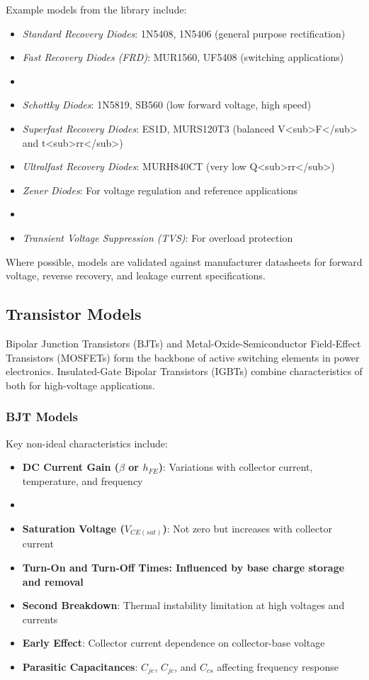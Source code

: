 Example models from the library include:
\begin{itemize}
    \item \textit{Standard Recovery Diodes}: 1N5408, 1N5406 (general purpose rectification)
    \item \textit{Fast Recovery Diodes (FRD)}: MUR1560, UF5408 (switching applications)
    \item \item \textit{Schottky Diodes}: 1N5819, SB560 (low forward voltage, high speed)
    \item \textit{Superfast Recovery Diodes}: ES1D, MURS120T3 (balanced V<sub>F</sub> and t<sub>rr</sub>)
    \item \textit{Ultralfast Recovery Diodes}: MURH840CT (very low Q<sub>rr</sub>)
    \item \textit{Zener Diodes}: For voltage regulation and reference applications
    \item \item \textit{Transient Voltage Suppression (TVS)}: For overload protection
\end{itemize}

Where possible, models are validated against manufacturer datasheets for forward voltage, reverse recovery, and leakage current specifications.

\subsection{Transistor Models}
Bipolar Junction Transistors (BJTs) and Metal-Oxide-Semiconductor Field-Effect Transistors (MOSFETs) form the backbone of active switching elements in power electronics. Insulated-Gate Bipolar Transistors (IGBTs) combine characteristics of both for high-voltage applications.

\subsubsection{BJT Models}
Key non-ideal characteristics include:
\begin{itemize}
    \item \textbf{DC Current Gain ($\beta$ or $h_{FE}$)}: Variations with collector current, temperature, and frequency
    \item \item \textbf{Saturation Voltage ($V_{CE(sat)}$)}: Not zero but increases with collector current
    \item \bf{Turn-On and Turn-Off Times}: Influenced by base charge storage and removal
    \item \textbf{Second Breakdown}: Thermal instability limitation at high voltages and currents
    \item \textbf{Early Effect}: Collector current dependence on collector-base voltage
    \item \textbf{Parasitic Capacitances}: $C_{je}$, $C_{jc}$, and $C_{cs}$ affecting frequency response
\end{itemize}


